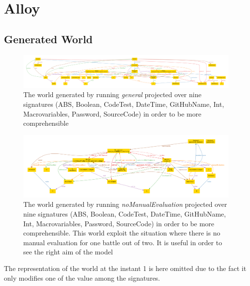 \section{Alloy}
\lstset{
  language=alloy,
  basicstyle=\small\ttfamily,
  breaklines=true,
  showstringspaces=false
}


\subsection{Generated World}
\begin{figure}[h]
  \centering
  \includegraphics[width=1\linewidth]{RASD/4Alloy/res/general.pdf}
  \caption{The world generated by running \textit{general} projected over nine signatures (ABS, Boolean, CodeTest, DateTime, GitHubName, Int, Macrovariables, Password, SourceCode) in order to be more comprehensible}
\end{figure}

\begin{figure}[h]
  \centering
  \includegraphics[width=1\linewidth]{RASD/4Alloy/res/noManualEvaluation.pdf}
  \caption{The world generated by running \textit{noManualEvaluation} projected over nine signatures (ABS, Boolean, CodeTest, DateTime, GitHubName, Int, Macrovariables, Password, SourceCode) in order to be more comprehensible. This world exploit the situation where there is no manual evaluation for one battle out of two. It is useful in order to see the right aim of the model}
\end{figure}

The representation of the world at the instant 1 is here omitted due to the fact it only modifies one of the value among the signatures.
